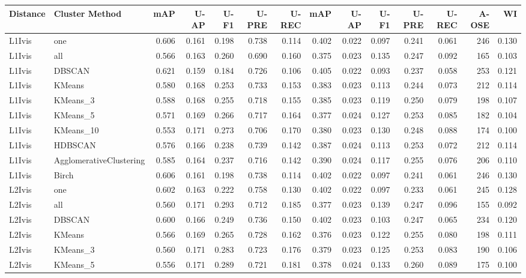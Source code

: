 \begin{tabular}{llrrrrrrrrrrrr}
\toprule
Distance & Cluster Method & mAP & U-AP & U-F1 & U-PRE & U-REC & mAP & U-AP & U-F1 & U-PRE & U-REC & A-OSE & WI \\
\midrule
L1Ivis & one & 0.606 & 0.161 & 0.198 & 0.738 & 0.114 & 0.402 & 0.022 & 0.097 & 0.241 & 0.061 & 246 & 0.130 \\
L1Ivis & all & 0.566 & 0.163 & 0.260 & 0.690 & 0.160 & 0.375 & 0.023 & 0.135 & 0.247 & 0.092 & 165 & 0.103 \\
L1Ivis & DBSCAN & 0.621 & 0.159 & 0.184 & 0.726 & 0.106 & 0.405 & 0.022 & 0.093 & 0.237 & 0.058 & 253 & 0.121 \\
L1Ivis & KMeans & 0.580 & 0.168 & 0.253 & 0.733 & 0.153 & 0.383 & 0.023 & 0.113 & 0.244 & 0.073 & 212 & 0.114 \\
L1Ivis & KMeans_3 & 0.588 & 0.168 & 0.255 & 0.718 & 0.155 & 0.385 & 0.023 & 0.119 & 0.250 & 0.079 & 198 & 0.107 \\
L1Ivis & KMeans_5 & 0.571 & 0.169 & 0.266 & 0.717 & 0.164 & 0.377 & 0.024 & 0.127 & 0.253 & 0.085 & 182 & 0.104 \\
L1Ivis & KMeans_10 & 0.553 & 0.171 & 0.273 & 0.706 & 0.170 & 0.380 & 0.023 & 0.130 & 0.248 & 0.088 & 174 & 0.100 \\
L1Ivis & HDBSCAN & 0.576 & 0.166 & 0.238 & 0.739 & 0.142 & 0.387 & 0.024 & 0.113 & 0.253 & 0.072 & 212 & 0.114 \\
L1Ivis & AgglomerativeClustering & 0.585 & 0.164 & 0.237 & 0.716 & 0.142 & 0.390 & 0.024 & 0.117 & 0.255 & 0.076 & 206 & 0.110 \\
L1Ivis & Birch & 0.606 & 0.161 & 0.198 & 0.738 & 0.114 & 0.402 & 0.022 & 0.097 & 0.241 & 0.061 & 246 & 0.130 \\
L2Ivis & one & 0.602 & 0.163 & 0.222 & 0.758 & 0.130 & 0.402 & 0.022 & 0.097 & 0.233 & 0.061 & 245 & 0.128 \\
L2Ivis & all & 0.560 & 0.171 & 0.293 & 0.712 & 0.185 & 0.377 & 0.023 & 0.139 & 0.247 & 0.096 & 155 & 0.092 \\
L2Ivis & DBSCAN & 0.600 & 0.166 & 0.249 & 0.736 & 0.150 & 0.402 & 0.023 & 0.103 & 0.247 & 0.065 & 234 & 0.120 \\
L2Ivis & KMeans & 0.566 & 0.169 & 0.265 & 0.728 & 0.162 & 0.376 & 0.023 & 0.122 & 0.255 & 0.080 & 198 & 0.111 \\
L2Ivis & KMeans_3 & 0.560 & 0.171 & 0.283 & 0.723 & 0.176 & 0.379 & 0.023 & 0.125 & 0.253 & 0.083 & 190 & 0.106 \\
L2Ivis & KMeans_5 & 0.556 & 0.171 & 0.289 & 0.721 & 0.181 & 0.378 & 0.024 & 0.133 & 0.260 & 0.089 & 175 & 0.100 \\

\end{tabular}
